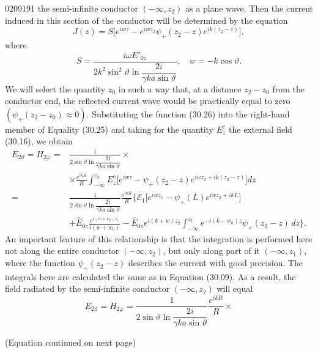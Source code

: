 \begin{scanpage}{0209}{191}
\noindent the semi-infinite conductor $(-\infty,z_2)$ as a plane wave. Then the current induced in this section of the conductor will be determined by the equation
\[J(z)=S\bigl[e^{iwz}-e^{iwz_2}\psi_+(z_2-z)e^{ik(z_2-z)}\bigr],\tag{30.26}\]
where
\[S=\frac{i\omega E'_{0z}}{2k^2\sin^2\vartheta\ln\dfrac{2i}{\gamma ka\sin\vartheta}},\quad w=-k\cos\vartheta.\tag{30.27}\]
We will select the quantity $z_0$ in such a way that, at a distance $z_2-z_0$ from the conductor end, the reflected current wave would be practically equal to zero $(\psi_+(z_2-z_0)\approx0)$. Substituting the function (30.26) into the right-hand member of Equality (30.25) and taking for the quantity $E_z^e$ the external field (30.16), we obtain
\[
\begin{aligned}
E_{2\vartheta}=H_{2\varphi}={}&\frac{1}{2\sin\vartheta\ln\dfrac{2i}{\gamma ka\sin\vartheta}}\times\\
&\times\frac{e^{ikR}}R\int_{-\infty}^{z_2}E_z^e\bigl[e^{iwz}-\psi_+(z_2-z)e^{iwz_2+ik(z_2-z)}\bigr]dz\\
={}&\frac{1}{2\sin\vartheta\ln\dfrac{2i}{\gamma ka\sin\vartheta}}\frac{e^{ikR}}R\Biggl\{\mathcal E_1\bigl[e^{iwz_1}-\psi_+(L)e^{iwz_2+ikL}\bigr]\\
&+\hat E_{0z}\frac{e^{i(w+w_0)z_1}}{i(w+w_0)}
-\hat E_{0z}e^{i(k+w)z_2}\int_{-\infty}^{z_1}e^{-i(k-w_0)z}\psi_+(z_2-z)\,dz\Biggr\}.
\end{aligned}\tag{30.28}
\]
An important feature of this relationship is that the integration is performed here not along the entire conductor $(-\infty,z_2)$, but only along part of it $(-\infty,z_1)$, where the function $\psi_+(z_2-z)$ describes the current with good precision. The integrals here are calculated the same as in Equation (30.09). As a result, the field radiated by the semi-infinite conductor $(-\infty,z_2)$ will equal
\[E_{2\vartheta}=H_{2\varphi}=\frac{1}{2\sin\vartheta\ln\dfrac{2i}{\gamma ka\sin\vartheta}}\frac{e^{ikR}}R\times\]
\begin{flushright}(Equation continued on next page)\end{flushright}
\end{scanpage}
